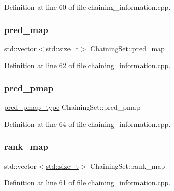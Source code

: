 Definition at line 60 of file chaining\+\_\+information.\+cpp.

\mbox{\label{structChainingSet_aab628bd290de132df07992c5256d6ec9}} 
\subsubsection{\texorpdfstring{pred\+\_\+map}{pred\_map}}
{\footnotesize\ttfamily std\+::vector$<$\hyperlink{tutorial__pact__2019_2Introduction_2sixth_2test_8c_a7c94ea6f8948649f8d181ae55911eeaf}{std\+::size\+\_\+t}$>$ Chaining\+Set\+::pred\+\_\+map}



Definition at line 62 of file chaining\+\_\+information.\+cpp.

\mbox{\label{structChainingSet_ab2bfcab43f89674f3ee1935f47721718}} 
\subsubsection{\texorpdfstring{pred\+\_\+pmap}{pred\_pmap}}
{\footnotesize\ttfamily \hyperlink{structChainingSet_a0c0db2b75967dbe93b78cd1f4751c780}{pred\+\_\+pmap\+\_\+type} Chaining\+Set\+::pred\+\_\+pmap}



Definition at line 64 of file chaining\+\_\+information.\+cpp.

\mbox{\label{structChainingSet_aa275e0add1bb5e825988ce58be9dbb1c}} 
\subsubsection{\texorpdfstring{rank\+\_\+map}{rank\_map}}
{\footnotesize\ttfamily std\+::vector$<$\hyperlink{tutorial__pact__2019_2Introduction_2sixth_2test_8c_a7c94ea6f8948649f8d181ae55911eeaf}{std\+::size\+\_\+t}$>$ Chaining\+Set\+::rank\+\_\+map}



Definition at line 61 of file chaining\+\_\+information.\+cpp.

